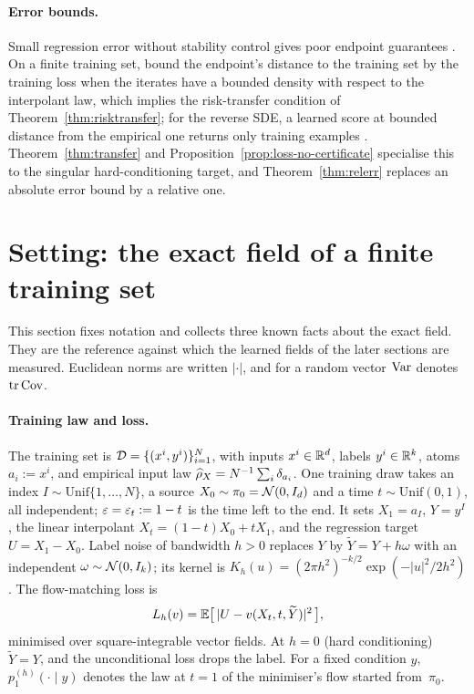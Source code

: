 \documentclass{article} %
\theoremstyle{plain}
\theoremstyle{definition}
\theoremstyle{remark}
\begin{document}
\paragraph{Error bounds.} Small regression error without stability control gives poor endpoint
guarantees \citep[Sec.~3 and Theorem~1]{benton2024error}
\citep[App.~D, Props.~D.1 and~D.3]{beltran2026reward}. On a finite training set,
\citet[Theorems~4--5]{li2026memory} bound the endpoint's distance to the training set by the
training loss when the iterates have a bounded density with respect to the interpolant law, which
implies the risk-transfer condition of Theorem~\ref{thm:risktransfer}; for the reverse SDE, a
learned score at bounded distance from the empirical one returns only training examples
\citep[Theorem~2]{pidstrigach2022manifolds}. Theorem~\ref{thm:transfer} and
Proposition~\ref{prop:loss-no-certificate} specialise this to the singular hard-conditioning
target, and Theorem~\ref{thm:relerr} replaces an absolute error bound by a relative one.

\section{Setting: the exact field of a finite training set}
\label{sec:theory}

This section fixes notation and collects three known facts about the exact field. They are the
reference against which the learned fields of the later sections are measured. Euclidean norms are
written $|\cdot|$, and for a random vector $\operatorname{Var}$ denotes $\operatorname{tr}\operatorname{Cov}$.

\paragraph{Training law and loss.} The training set is $\mathcal{D}=\{(x^i,y^i)\}_{i=1}^N$, with inputs
$x^i\in\mathbb{R}^d$, labels $y^i\in\mathbb{R}^k$, atoms $a_i:=x^i$, and empirical input law $\widehat{\rho}_X=N^{-1}\sum_i\delta_{a_i}$. One
training draw takes an index $I\sim\mathrm{Unif}\{1,\dots,N\}$, a source $X_0\sim\pi_0=\mathcal{N}(0,I_d)$
and a time $t\sim\mathrm{Unif}(0,1)$, all independent; $\varepsilon=\varepsilon_t:=1-t$ is the time left to the end. It sets $X_1=a_I$, $Y=y^I$, the linear
interpolant $X_t=(1-t)X_0+tX_1$, and the regression target $U=X_1-X_0$. Label noise of bandwidth
$h>0$ replaces $Y$ by $\widetilde Y=Y+h\omega$ with an independent $\omega\sim\mathcal{N}(0,I_k)$; its kernel
is $K_h(u)=(2\pi h^2)^{-k/2}\exp(-|u|^2/2h^2)$. The flow-matching loss is
\begin{equation}
L_h(v)=\mathbb{E}\big[\,|U-v(X_t,t,\widetilde Y)|^2\,\big],
\label{eq:objective}
\end{equation}
minimised over square-integrable vector fields. At $h=0$ (hard conditioning) $\widetilde Y=Y$, and
the unconditional loss drops the label. For a fixed condition $y$, $p_1^{(h)}(\cdot\mid y)$ denotes
the law at $t=1$ of the minimiser's flow started from~$\pi_0$.
\end{document}
